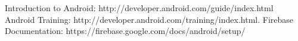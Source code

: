 \begin{thebibliography}{3}
\bibitem{} Introduction to Android: http://developer.android.com/guide/index.html
\bibitem{} Android Training: http://developer.android.com/training/index.html.
\bibitem{} Firebase Documentation: https://firebase.google.com/docs/android/setup/
\end{thebibliography}